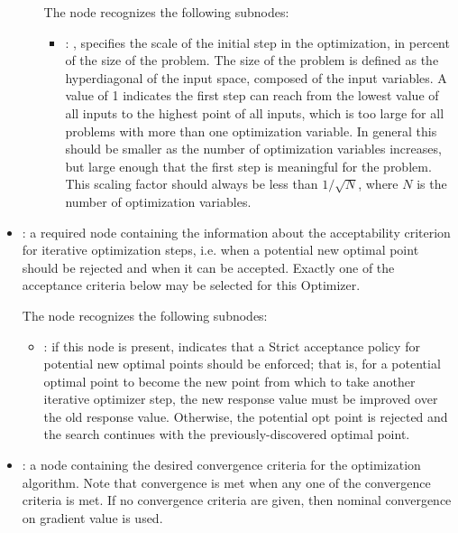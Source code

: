 \begin{itemize}
\begin{itemize}
          The  node recognizes the following subnodes:
          \begin{itemize}
            \item {}: , 
              specifies the scale of the initial step in the optimization, in percent of the
              size of the problem. The size of the problem is defined as the hyperdiagonal of the
              input space, composed of the input variables. A value of 1 indicates the first step
              can reach from the lowest value of all inputs to the highest point of all inputs,
              which is too large for all problems with more than one optimization variable. In
              general this               should be smaller as the number of optimization variables
              increases, but large enough               that the first step is meaningful for the
              problem. This scaling factor should always               be less than $1/\sqrt{N}$,
              where $N$ is the number of optimization variables. 
          \end{itemize}
      \end{itemize}

    \item {}:
      a required node containing the information about the acceptability criterion for iterative
      optimization steps, i.e. when a potential new optimal point should be rejected and when
      it can be accepted. Exactly one of the acceptance criteria               below may be selected
      for this Optimizer.

      The  node recognizes the following subnodes:
      \begin{itemize}
        \item {}:
          if this node is present, indicates that a Strict acceptance policy for         potential
          new optimal points should be enforced; that is, for a potential optimal point to
          become the new point from which to take another iterative optimizer step, the new response
          value         must be improved over the old response value. Otherwise, the potential opt
          point is rejected         and the search continues with the previously-discovered optimal
          point.
      \end{itemize}

    \item {}:
      a node containing the desired convergence criteria for the optimization algorithm.
      Note that convergence is met when any one of the convergence criteria is met. If no
      convergence               criteria are given, then nominal convergence on gradient value is
      used.


\end{itemize}
